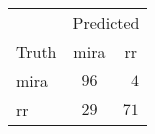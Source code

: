 \begin{tabular}{lcc}
\hline
 & \multicolumn{2}{c}{Predicted} \\ 
Truth  & mira & \multicolumn{1}{c}{rr} \\ 
\hline
mira  & $96$ & $\phantom{0}4$ \\
rr  & $29$ & $71$ \\
\hline 
\end{tabular}
